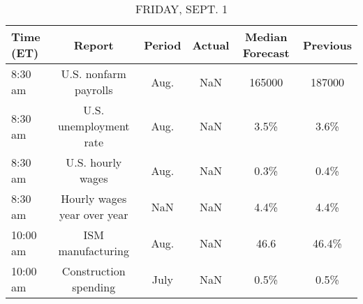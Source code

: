 \documentclass{article}%
\begin{document}
%


\begin{table}[htbp]%
\caption{FRIDAY, SEPT. 1}%
\centering%
\begin{adjustbox}{width=1\textwidth}%
\begin{tabular}{lccccc}
\toprule
Time (ET) &                      Report & Period & Actual & Median Forecast & Previous \\
\midrule
  8:30 am &       U.S. nonfarm payrolls &   Aug. &    NaN &          165000 &   187000 \\
  8:30 am &      U.S. unemployment rate &   Aug. &    NaN &            3.5\% &     3.6\% \\
  8:30 am &           U.S. hourly wages &   Aug. &    NaN &            0.3\% &     0.4\% \\
  8:30 am & Hourly wages year over year &    NaN &    NaN &            4.4\% &     4.4\% \\
 10:00 am &           ISM manufacturing &   Aug. &    NaN &            46.6 &    46.4\% \\
 10:00 am &       Construction spending &   July &    NaN &            0.5\% &     0.5\% \\
\bottomrule
\end{tabular}
%
\end{adjustbox}%
\end{table}
\end{document}
